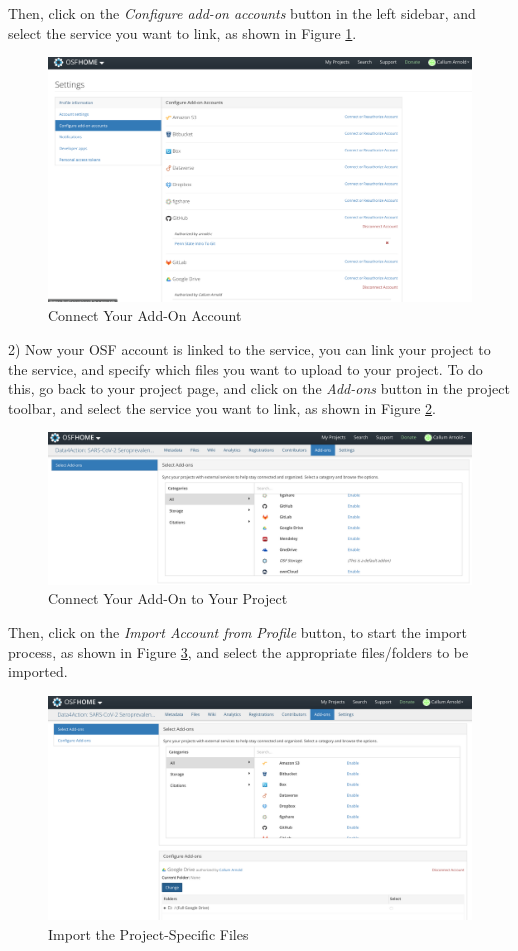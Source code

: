 \documentclass{scrartcl}
\begin{document}
Then, click on the \emph{Configure add-on accounts} button in the left sidebar, and select the service you want to link, as shown in Figure \ref{fig:addons-account-settings-02}.

\begin{figure}[h]
    \centering
    \includegraphics[width=\textwidth]{addons-account-settings-02.png}
    \caption{Connect Your Add-On Account}
    \label{fig:addons-account-settings-02}
\end{figure}

2) Now your OSF account is linked to the service, you can link your project to the service, and specify which files you want to upload to your project.
To do this, go back to your project page, and click on the \emph{Add-ons} button in the project toolbar, and select the service you want to link, as shown in Figure \ref{fig:addons-project-01}.

\begin{figure}[h]
    \centering
    \includegraphics[width=\textwidth]{addons-project-01.png}
    \caption{Connect Your Add-On to Your Project}
    \label{fig:addons-project-01}
\end{figure}

Then, click on the \emph{Import Account from Profile} button, to start the import process, as shown in Figure \ref{fig:addons-project-02}, and select the appropriate files/folders to be imported.

\begin{figure}[h]
    \centering
    \includegraphics[width=\textwidth]{addons-project-02.png}
    \caption{Import the Project-Specific Files}
    \label{fig:addons-project-02}
\end{figure}
\end{document}
